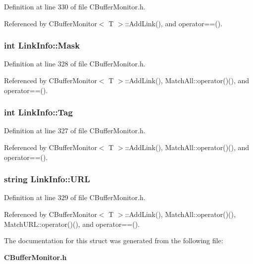 Definition at line 330 of file CBuffer\-Monitor.h.

Referenced by CBuffer\-Monitor$<$ T $>$::Add\-Link(), and operator==().
\subsubsection{\setlength{\rightskip}{0pt plus 5cm}int Link\-Info::Mask}\label{structLinkInfo_m1}




Definition at line 328 of file CBuffer\-Monitor.h.

Referenced by CBuffer\-Monitor$<$ T $>$::Add\-Link(), Match\-All::operator()(), and operator==().
\subsubsection{\setlength{\rightskip}{0pt plus 5cm}int Link\-Info::Tag}\label{structLinkInfo_m0}




Definition at line 327 of file CBuffer\-Monitor.h.

Referenced by CBuffer\-Monitor$<$ T $>$::Add\-Link(), Match\-All::operator()(), and operator==().
\subsubsection{\setlength{\rightskip}{0pt plus 5cm}string Link\-Info::URL}\label{structLinkInfo_m2}




Definition at line 329 of file CBuffer\-Monitor.h.

Referenced by CBuffer\-Monitor$<$ T $>$::Add\-Link(), Match\-All::operator()(), Match\-URL::operator()(), and operator==().

The documentation for this struct was generated from the following file:\begin{CompactItemize}
\item 
{\bf CBuffer\-Monitor.h}\end{CompactItemize}
